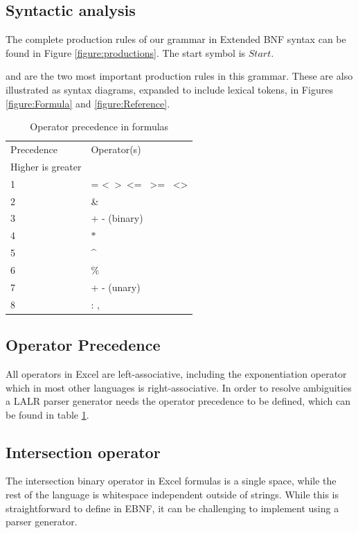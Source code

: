 \documentclass[conference]{IEEEtran}
\begin{document}
\subsection{Syntactic analysis}
\label{subsection:productionRules}

The complete production rules of our grammar in Extended BNF syntax can be found in Figure \ref{figure:productions}.
The start symbol is $Start$.

 and  are the two most important production rules in this grammar.
These are also illustrated as syntax diagrams, expanded to include lexical tokens, in Figures \ref{figure:Formula} and \ref{figure:Reference}.
\begin{table}
\caption{Operator precedence in formulas}
\label{table:operatorprec}
\begin{tabular}{ll}
Precedence & Operator(s) \\
Higher is greater & \\
1 & = \textless \  \textgreater \  \textless= \  \textgreater= \  \textless\textgreater          \\
2 & \&  \\
3 & + - (binary) \\
4 & $\ast$ \\
5 & \textasciicircum \\
6 & \% \\
7 & + - (unary) \\
8 & : , \texttt{\char32}
\end{tabular}
\end{table}

\subsection{Operator Precedence}
\label{sec:operatorprecedence}

All operators in Excel are left-associative, including the exponentiation operator which in most other languages is right-associative.
In order to resolve ambiguities a LALR parser generator needs the operator precedence to be defined, which can be found in table \ref{table:operatorprec}.

\subsection{Intersection operator}

The intersection binary operator in Excel formulas is a single space, while the rest of the language is whitespace independent outside of strings. While this is straightforward to define in EBNF, it can be challenging to implement using a parser generator.
\end{document}
